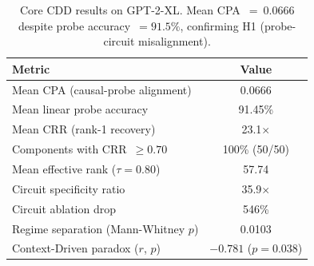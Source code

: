 
\begin{table}[t]
\centering
\caption{Core CDD results on GPT-2-XL. Mean CPA~$=~0.0666$ despite probe
accuracy~$= 91.5\%$, confirming H1 (probe-circuit misalignment).}
\label{tab:core}
\begin{tabular}{lc}
\toprule
Metric & Value \\
\midrule
Mean CPA (causal-probe alignment)       & 0.0666 \\
Mean linear probe accuracy              & 91.45\% \\
Mean CRR (rank-1 recovery)              & 23.1$\times$ \\
Components with CRR~$\geq 0.70$         & 100\% (50/50) \\
Mean effective rank ($\tau = 0.80$)     & 57.74 \\
Circuit specificity ratio               & 35.9$\times$ \\
Circuit ablation drop                   & 546\% \\
Regime separation (Mann-Whitney $p$)    & 0.0103 \\
Context-Driven paradox ($r$, $p$)       & $-0.781$ ($p=0.038$) \\
\bottomrule
\end{tabular}
\end{table}
